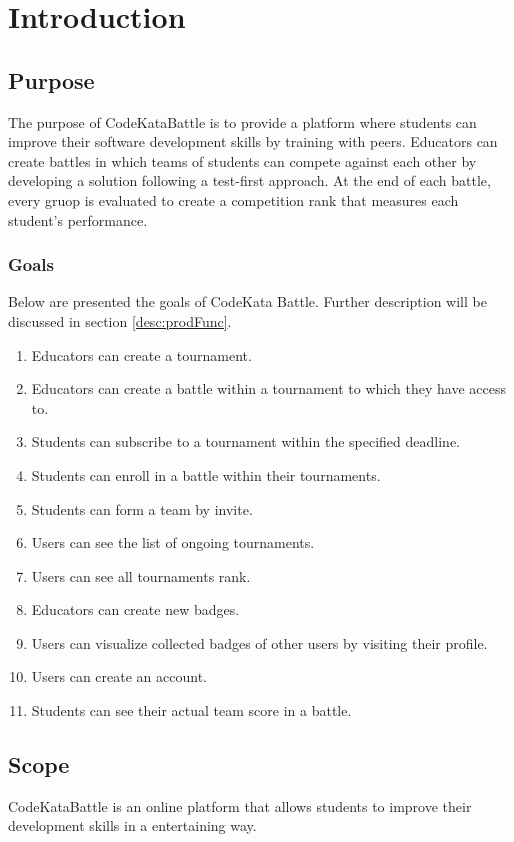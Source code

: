 \chapter{Introduction}

\section{Purpose}
The purpose of CodeKataBattle is to provide a platform where students can improve their software development skills by training with peers. 
Educators can create battles in which teams of students can compete against each other by developing a solution following a test-first approach.
At the end of each battle, every gruop is evaluated to create a competition rank that measures each student's performance.


\subsection{Goals}\label{intro:goals}
Below are presented the goals of CodeKata Battle. Further description will be discussed in section \ref{desc:prodFunc}.
\begin{enumerate}[label=\textbf{G.\arabic*}]
	\item Educators can create a tournament.
        \item Educators can create a battle within a tournament to which they have access to.
        \item Students can subscribe to a tournament within the specified deadline.
        \item Students can enroll in a battle within their tournaments.
        \item Students can form a team by invite.
        \item Users can see the list of ongoing tournaments.
        \item Users can see all tournaments rank.
        \item Educators can create new badges.
        \item Users can visualize collected badges of other users by visiting their profile.
        \item Users can create an account.
        \item Students can see their actual team score in a battle.
\end{enumerate}

\section{Scope}
CodeKataBattle is an online platform that allows students to improve their development skills in a entertaining way. 

